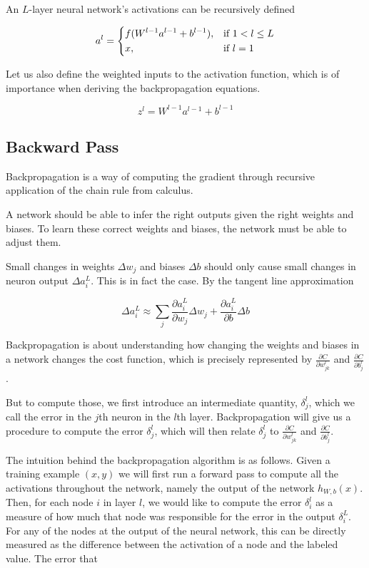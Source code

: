 An $L$-layer neural network's activations can be recursively defined

$$
a^{l} =
\begin{dcases}
    f(W^{l-1}a^{l-1} + b^{l-1}),& \text{if } 1 < l \leq L\\
    x,              & \text{if } l = 1
\end{dcases}
$$

Let us also define the weighted inputs to the activation function, which is of importance when deriving the backpropagation equations.

$$
z^{l} = W^{l-1}a^{l-1} + b^{l-1}
$$

\subsection{Backward Pass}

Backpropagation is a way of computing the gradient through recursive application of the chain rule from calculus.

A network should be able to infer the right outputs given the right weights and biases. To learn these correct weights and biases, the network must be able to adjust them.

Small changes in weights $\Delta w_j$ and biases $\Delta b$ should only cause small changes in neuron output $\Delta a^L_i$. This is in fact the case. By the tangent line approximation

$$
\Delta a^L_i \approx \sum_j \frac{\partial a^L_i}{\partial w_j} \Delta w_j + \frac{\partial a^L_i}{\partial b} \Delta b
$$

Backpropagation is about understanding how changing the weights and biases in a network changes the cost function, which is precisely represented by $\frac{\partial C}{\partial w^l_{jk}}$ and $\frac{\partial C}{\partial b^l_j}$.

But to compute those, we first introduce an intermediate quantity, $\delta^l_j$, which we call the error in the $j$th neuron in the $l$th layer. Backpropagation will give us a procedure to compute the error $\delta^l_j$, which will then relate $\delta^l_j$ to $\frac{\partial C}{\partial w^l_{jk}}$ and $\frac{\partial C}{\partial b^l_j}$.



The intuition behind the backpropagation algorithm is as follows. Given a training example $(x, y)$ we will first run a forward pass to compute all the activations throughout the network, namely the output of the network $h_{W,b}(x)$. Then, for each node $i$ in layer $l$, we would like to compute the error $\delta^{l}_i$ as a measure of how much that node was responsible for the error in the output $\delta^{L}_i$. For any of the nodes at the output of the neural network, this can be directly measured as the difference between the activation of a node and the labeled value.
The error that

